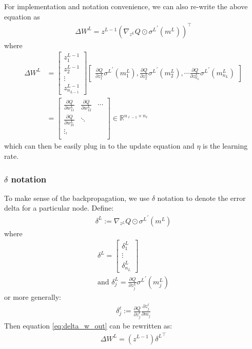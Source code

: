 \documentclass{article} [10pt] %
\begin{document}
For implementation and notation convenience, we can also re-write the above equation as
\begin{align} \label{eq:delta_w_out}
\boxed{
	\Delta W^L = z^{L-1}(\nabla_{z^L}Q \odot {\sigma^L}^\prime(m^L))^\top
}
\end{align}
where
\begin{align}
	\Delta W^L &= \begin{bmatrix}z^{L-1}_1\\ z^{L-1}_2\\ \vdots \\z^{L-1}_{n_{L-1}}\end{bmatrix}
	\begin{bmatrix}   \frac{\partial Q}{\partial z^L_{1}}{\sigma^L}^\prime(m^L_{1}),
	\frac{\partial Q}{\partial z^L_{2}}{\sigma^L}^\prime(m^L_{2}), \cdots
	\frac{\partial Q}{\partial z^L_{n_L}}{\sigma^L}^\prime(m^L_{n_L})
	\end{bmatrix}\\
	 &= \begin{bmatrix}
				\frac{\partial Q}{\partial w^L_{11}} &\frac{\partial Q}{\partial w^L_{12}} &\cdots \\
				\frac{\partial Q}{\partial w^L_{21}} &\ddots \\
				\vdots,\\
				\end{bmatrix} \in \mathbb{R}^{n_{\ell-1}\times n_\ell}
\end{align}
which can then be easily plug in to the update equation  and $\eta$ is the learning rate.


\subsubsection{$\delta$ notation}
To make sense of the backpropagation, we use $\delta$ notation to denote the error delta for a particular node. Define:
\begin{align}
	\delta^L := \nabla_{z^L}Q \odot {\sigma^L}^\prime(m^L)
\end{align}
where
\begin{align}
	\delta^L = \begin{bmatrix} \delta^L_1\\ \vdots\\ \delta^L_{n_L}\end{bmatrix} \\ 
	\text{and } 
	\delta^L_j =\frac{\partial Q}{\partial z^L_{j}}{\sigma^L}^\prime(m^L_{j}) \label{eq:node_delta_output}
\end{align}
or more generally:
\begin{align}
	\delta^\ell_j := \frac{\partial Q}{\partial z^\ell_j}\frac{\partial z^\ell_j}{\partial m_j}
\end{align}
Then equation \eqref{eq:delta_w_out} can be rewritten as:
\begin{align}
	\Delta W^L = (z^{L-1}){\delta^L}^\top
\end{align}
\end{document}
